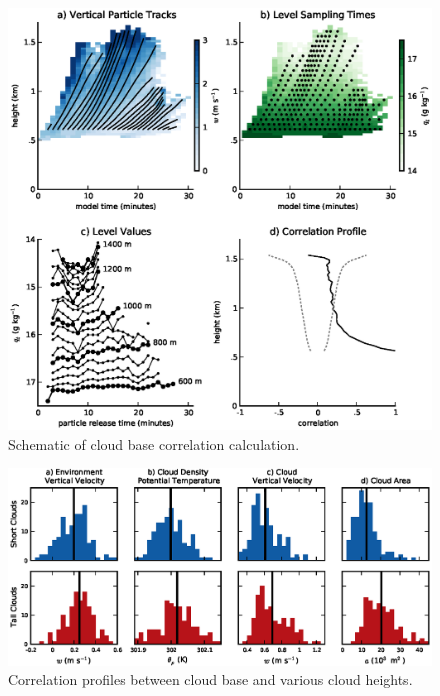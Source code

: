 \documentclass[acp]{copernicus}
\begin{document}
\begin{figure}[t]
\vspace*{2mm}
\begin{center}
\includegraphics[width=\textwidth]{./figures/cloud_base_schematic}
\end{center}
\caption{Schematic of cloud base correlation calculation.}
\label{fig:cloud_base_schematic}
\end{figure}

\begin{figure}[t]
\vspace*{2mm}
\begin{center}
\includegraphics[width=\textwidth]{./figures/cloud_environment_histograms}
\end{center}
\caption{Correlation profiles between cloud base and various cloud heights.}
\label{fig:cloud_envionment_histograms}
\end{figure}
\end{document}
